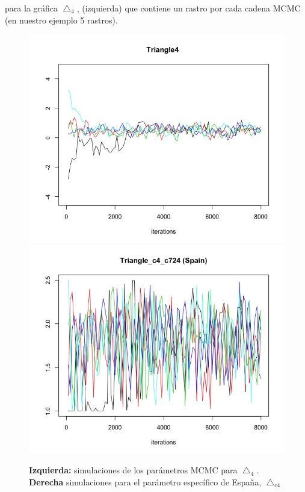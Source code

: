 \vspace{-0.3cm}
\noindent para la gráfica $\bigtriangleup_{4}$, (izquierda) que contiene un rastro por cada cadena MCMC (en nuestro ejemplo 5 rastros).

\begin{figure}[!ht]
\centering
\hspace*{-1cm}
\includegraphics[scale=0.37]{Cap2/bayesTFR03.jpeg}\includegraphics[scale=0.37]{Cap2/bayesTFR04.jpeg}
\captionsetup{width=1.05\linewidth}
\caption[Simulaciones del parámetro $\bigtriangleup$]{\textbf{Izquierda:} simulaciones de los parámetros MCMC para $\bigtriangleup_{4}$. \textbf{Derecha }simulaciones para el parámetro específico de España, $\bigtriangleup_{c4}$}
\end{figure}

